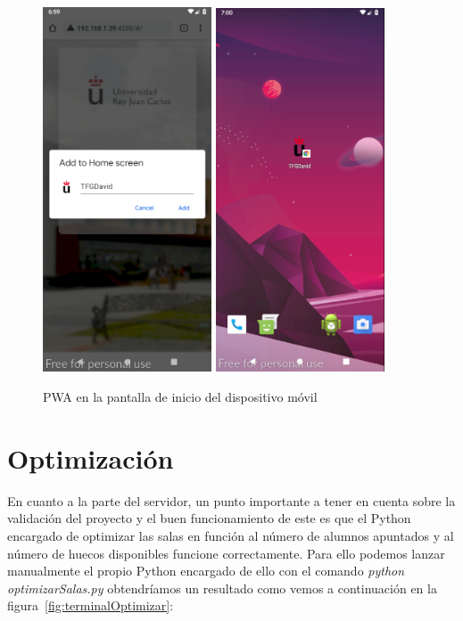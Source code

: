 \documentclass[a4paper, 12pt]{book}
\begin{document}
	\begin{figure}[h!]
  	\centering
  	\includegraphics[width=5cm, keepaspectratio]{img/addHomeMovil.png}
  	\includegraphics[width=5cm, keepaspectratio]{img/homeMovil.png}
  	\caption{PWA en la pantalla de inicio del dispositivo móvil}\label{fig:homeMovil}
	\end{figure} 
 
\section{Optimización}
En cuanto a la parte del servidor, un punto importante a tener en cuenta sobre la validación del proyecto y el buen funcionamiento de este es que el Python encargado de optimizar las salas en función al número de alumnos apuntados y al número de huecos disponibles funcione correctamente. Para ello podemos lanzar manualmente el propio Python encargado de ello con el comando \textit{python optimizarSalas.py} obtendríamos un resultado como vemos a continuación en la figura~\ref{fig:terminalOptimizar}:
 
\end{document}

